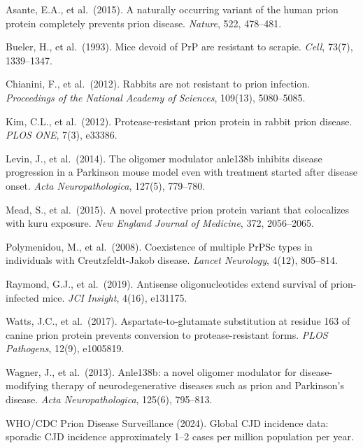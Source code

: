 \documentclass[12pt,a4paper]{article}
\begin{document}
\begin{enumerate}[label={[\arabic*]}, leftmargin=2.5em, itemsep=0.3em]
  \item Asante, E.A., et al.\ (2015). A naturally occurring variant of the
    human prion protein completely prevents prion disease.
    \textit{Nature}, 522, 478--481.

  \item Bueler, H., et al.\ (1993). Mice devoid of PrP are resistant to
    scrapie. \textit{Cell}, 73(7), 1339--1347.

  \item Chianini, F., et al.\ (2012). Rabbits are not resistant to prion
    infection. \textit{Proceedings of the National Academy of Sciences},
    109(13), 5080--5085.

  \item Kim, C.L., et al.\ (2012). Protease-resistant prion protein in
    rabbit prion disease. \textit{PLOS ONE}, 7(3), e33386.

  \item Levin, J., et al.\ (2014). The oligomer modulator anle138b
    inhibits disease progression in a Parkinson mouse model even with
    treatment started after disease onset. \textit{Acta Neuropathologica},
    127(5), 779--780.

  \item Mead, S., et al.\ (2015). A novel protective prion protein
    variant that colocalizes with kuru exposure. \textit{New England
    Journal of Medicine}, 372, 2056--2065.

  \item Polymenidou, M., et al.\ (2008). Coexistence of multiple PrPSc
    types in individuals with Creutzfeldt-Jakob disease.
    \textit{Lancet Neurology}, 4(12), 805--814.

  \item Raymond, G.J., et al.\ (2019). Antisense oligonucleotides extend
    survival of prion-infected mice. \textit{JCI Insight}, 4(16), e131175.

  \item Watts, J.C., et al.\ (2017). Aspartate-to-glutamate substitution
    at residue 163 of canine prion protein prevents conversion to
    protease-resistant forms. \textit{PLOS Pathogens}, 12(9), e1005819.

  \item Wagner, J., et al.\ (2013). Anle138b: a novel oligomer modulator
    for disease-modifying therapy of neurodegenerative diseases such as
    prion and Parkinson's disease. \textit{Acta Neuropathologica}, 125(6),
    795--813.

  \item WHO/CDC Prion Disease Surveillance (2024). Global CJD incidence
    data: sporadic CJD incidence approximately 1--2 cases per million
    population per year.
\end{enumerate}
\end{document}

